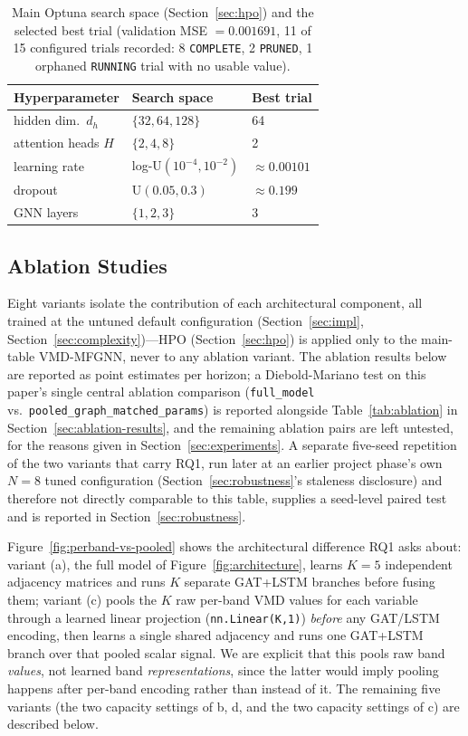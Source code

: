 \documentclass[journal]{IEEEtran}
\begin{document}
\begin{table}[t]
\centering
\caption{Main Optuna search space (Section~\ref{sec:hpo}) and the selected best trial (validation MSE $=0.001691$, 11 of 15 configured trials recorded: 8 \texttt{COMPLETE}, 2 \texttt{PRUNED}, 1 orphaned \texttt{RUNNING} trial with no usable value).}
\label{tab:hpo-space}
\begin{tabular}{lll}
\toprule
Hyperparameter & Search space & Best trial \\
\midrule
hidden dim.\ $d_h$ & $\{32, 64, 128\}$ & 64 \\
attention heads $H$ & $\{2, 4, 8\}$ & 2 \\
learning rate & log-U$(10^{-4}, 10^{-2})$ & $\approx 0.00101$ \\
dropout & U$(0.05, 0.3)$ & $\approx 0.199$ \\
GNN layers & $\{1, 2, 3\}$ & 3 \\
\bottomrule
\end{tabular}
\end{table}

\subsection{Ablation Studies}
\label{sec:ablation}

Eight variants isolate the contribution of each architectural component, all trained at the untuned default configuration (Section~\ref{sec:impl}, Section~\ref{sec:complexity})---HPO (Section~\ref{sec:hpo}) is applied only to the main-table VMD-MFGNN, never to any ablation variant. The ablation results below are reported as point estimates per horizon; a Diebold-Mariano test on this paper's single central ablation comparison (\texttt{full\_model} vs.\ \texttt{pooled\_graph\_matched\_params}) is reported alongside Table~\ref{tab:ablation} in Section~\ref{sec:ablation-results}, and the remaining ablation pairs are left untested, for the reasons given in Section~\ref{sec:experiments}. A separate five-seed repetition of the two variants that carry RQ1, run later at an earlier project phase's own $N=8$ tuned configuration (Section~\ref{sec:robustness}'s staleness disclosure) and therefore not directly comparable to this table, supplies a seed-level paired test and is reported in Section~\ref{sec:robustness}.

Figure~\ref{fig:perband-vs-pooled} shows the architectural difference RQ1 asks about: variant (a), the full model of Figure~\ref{fig:architecture}, learns $K=5$ independent adjacency matrices and runs $K$ separate GAT+LSTM branches before fusing them; variant (c) pools the $K$ raw per-band VMD values for each variable through a learned linear projection (\texttt{nn.Linear(K,1)}) \emph{before} any GAT/LSTM encoding, then learns a single shared adjacency and runs one GAT+LSTM branch over that pooled scalar signal. We are explicit that this pools raw band \emph{values}, not learned band \emph{representations}, since the latter would imply pooling happens after per-band encoding rather than instead of it. The remaining five variants (the two capacity settings of b, d, and the two capacity settings of c) are described below.
\end{document}
